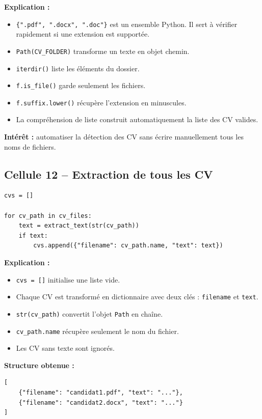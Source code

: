 \documentclass[12pt,a4paper]{article}
\begin{document}
\textbf{Explication :}
\begin{itemize}
  \item \texttt{\{".pdf", ".docx", ".doc"\}} est un ensemble Python. Il sert à vérifier rapidement si une extension est supportée.
  \item \texttt{Path(CV\_FOLDER)} transforme un texte en objet chemin.
  \item \texttt{iterdir()} liste les éléments du dossier.
  \item \texttt{f.is\_file()} garde seulement les fichiers.
  \item \texttt{f.suffix.lower()} récupère l'extension en minuscules.
  \item La compréhension de liste construit automatiquement la liste des CV valides.
\end{itemize}

\textbf{Intérêt :} automatiser la détection des CV sans écrire manuellement tous les noms de fichiers.

\subsection{Cellule 12 -- Extraction de tous les CV}

\begin{lstlisting}[style=pythonstyle]
cvs = []

for cv_path in cv_files:
    text = extract_text(str(cv_path))
    if text:
        cvs.append({"filename": cv_path.name, "text": text})
\end{lstlisting}

\textbf{Explication :}
\begin{itemize}
  \item \texttt{cvs = []} initialise une liste vide.
  \item Chaque CV est transformé en dictionnaire avec deux clés : \texttt{filename} et \texttt{text}.
  \item \texttt{str(cv\_path)} convertit l'objet \texttt{Path} en chaîne.
  \item \texttt{cv\_path.name} récupère seulement le nom du fichier.
  \item Les CV sans texte sont ignorés.
\end{itemize}

\textbf{Structure obtenue :}
\begin{lstlisting}[style=pythonstyle]
[
    {"filename": "candidat1.pdf", "text": "..."},
    {"filename": "candidat2.docx", "text": "..."}
]
\end{lstlisting}
\end{document}
